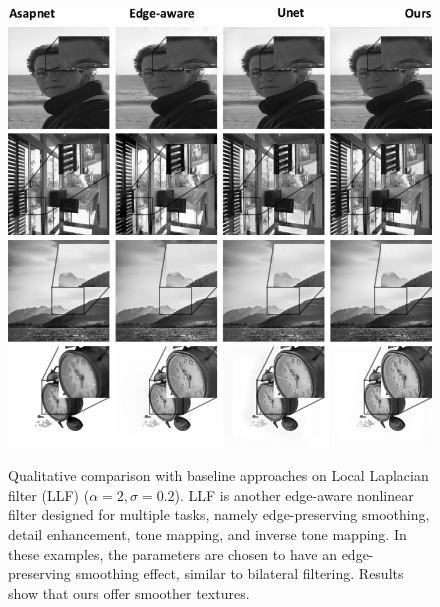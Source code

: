     

\begin{figure}%
  \centering
      \includegraphics[width=.82\linewidth]{Chapters/detail-retouching-figs/One-shot-labels.pdf}
  \includegraphics[width=\linewidth]{Chapters/detail-retouching-figs/Qualitative_zoomed_LLF_a2_s02.pdf}
    \caption{Qualitative comparison with baseline approaches on Local Laplacian filter (LLF) ($\alpha=2, \sigma=0.2$). LLF is another edge-aware nonlinear filter designed for multiple tasks, namely edge-preserving smoothing, detail enhancement, tone mapping, and inverse tone mapping. In these examples, the parameters are chosen to have an edge-preserving smoothing effect, similar to bilateral filtering. Results show that ours offer smoother textures.} 

   \label{fig:QualitativeComp_LLF_a2}%
\end{figure}

